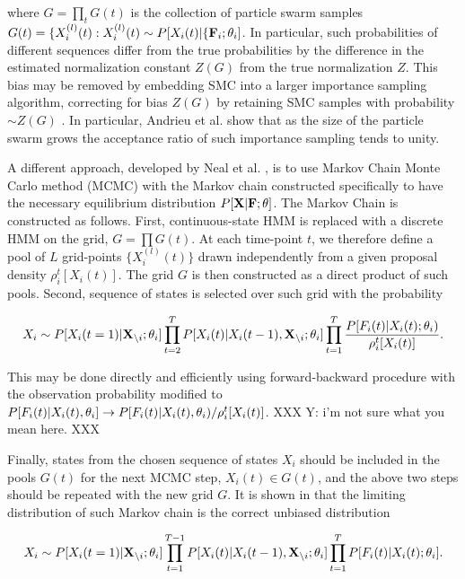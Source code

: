 \noindent where $G=\prod\limits_t G(t)$ is the collection of particle swarm samples $G(t)=\{X_i^{(l)}(t):  X_i^{(l)}(t) \sim P[X_i(t)|\{{\bf F}_i;\theta_i]$.  In particular, such probabilities of different sequences differ from the true probabilities by the difference in the estimated normalization constant $Z(G)$ from the true normalization $Z$.  This bias may be removed by embedding SMC into a larger importance sampling algorithm, correcting for bias $Z(G)$ by retaining SMC samples with probability $\sim Z(G)$ \cite{Andrieu2007}. In particular, Andrieu et al. \cite{Andrieu2007} show that as the size of the particle swarm grows the acceptance ratio of such importance sampling tends to unity.

A different approach, developed by Neal et al. \cite{NBR03}, is to use Markov Chain Monte Carlo method (MCMC) with the Markov chain constructed specifically to have the necessary equilibrium distribution $P[{\bf X}| {\bf F}; \theta]$. The Markov Chain is constructed as follows. First, continuous-state HMM is replaced with a discrete HMM on the grid, $G=\prod G(t)$. At each time-point $t$, we therefore define a pool of $L$ grid-points $\{X_i^{(l)}(t)\}$ drawn independently from a given proposal density $\rho_i^t[X_i(t)]$. The grid $G$ is then constructed as a direct product of such pools.  Second, sequence of states is selected over such grid with the probability

\begin{equation}\label{eqn:nealprob}
X_i\sim P[X_i(t=1)|{\bf X}_{\backslash i}; \mathbf{\theta}_i]\prod\limits_{t=2}^{T}P[X_i(t)|X_i(t-1), {\bf X}_{\backslash i}; \mathbf{\theta}_i] \prod\limits_{t=1}^{T} \frac{P[F_i(t)|X_i(t); \mathbf{\theta}_i)}{\rho_i^t[X_i(t)]}.
\end{equation}

This may be done directly and efficiently using forward-backward procedure with the observation probability modified to $P[F_i(t)|X_i(t), \mathbf{\theta}_i]\rightarrow P[F_i(t)|X_i(t), \mathbf{\theta}_i)/{\rho_i^t[X_i(t)]}$.  XXX Y: i'm not sure what you mean here.  XXX

Finally, states from the chosen sequence of states $X_i$ should be included in the pools $G(t)$ for the next MCMC step, $X_i(t)\in G(t)$, and the above two steps should be repeated with the new grid $G$. It is shown in \cite{NBR03} that the limiting distribution of such Markov chain is the correct unbiased distribution

\begin{equation}
X_i \sim P[X_i(t=1)|{\bf X}_{\backslash i}; \mathbf{\theta}_i]\prod\limits_{t=1}^{T-1}P[X_i(t)|X_i(t-1), {\bf X}_{\backslash i}; \mathbf{\theta}_i]\prod\limits_{t=1}^{T}P[F_i(t)|X_i(t); \mathbf{\theta}_i].
\end{equation}

